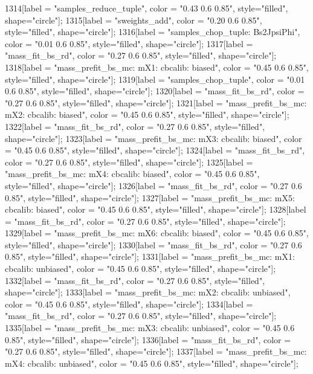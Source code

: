 {	1314[label = "samples_reduce_tuple", color = "0.43 0.6 0.85", style="filled", shape="circle"];
	1315[label = "sweights_add", color = "0.20 0.6 0.85", style="filled", shape="circle"];
	1316[label = "samples_chop_tuple\nmode: Bs2JpsiPhi", color = "0.01 0.6 0.85", style="filled", shape="circle"];
	1317[label = "mass_fit_bs_rd", color = "0.27 0.6 0.85", style="filled", shape="circle"];
	1318[label = "mass_prefit_bs_mc\nmassbin: mX1\nmassmodel: cbcalib\ntrigger: biased", color = "0.45 0.6 0.85", style="filled", shape="circle"];
	1319[label = "samples_chop_tuple", color = "0.01 0.6 0.85", style="filled", shape="circle"];
	1320[label = "mass_fit_bs_rd", color = "0.27 0.6 0.85", style="filled", shape="circle"];
	1321[label = "mass_prefit_bs_mc\nmassbin: mX2\nmassmodel: cbcalib\ntrigger: biased", color = "0.45 0.6 0.85", style="filled", shape="circle"];
	1322[label = "mass_fit_bs_rd", color = "0.27 0.6 0.85", style="filled", shape="circle"];
	1323[label = "mass_prefit_bs_mc\nmassbin: mX3\nmassmodel: cbcalib\ntrigger: biased", color = "0.45 0.6 0.85", style="filled", shape="circle"];
	1324[label = "mass_fit_bs_rd", color = "0.27 0.6 0.85", style="filled", shape="circle"];
	1325[label = "mass_prefit_bs_mc\nmassbin: mX4\nmassmodel: cbcalib\ntrigger: biased", color = "0.45 0.6 0.85", style="filled", shape="circle"];
	1326[label = "mass_fit_bs_rd", color = "0.27 0.6 0.85", style="filled", shape="circle"];
	1327[label = "mass_prefit_bs_mc\nmassbin: mX5\nmassmodel: cbcalib\ntrigger: biased", color = "0.45 0.6 0.85", style="filled", shape="circle"];
	1328[label = "mass_fit_bs_rd", color = "0.27 0.6 0.85", style="filled", shape="circle"];
	1329[label = "mass_prefit_bs_mc\nmassbin: mX6\nmassmodel: cbcalib\ntrigger: biased", color = "0.45 0.6 0.85", style="filled", shape="circle"];
	1330[label = "mass_fit_bs_rd", color = "0.27 0.6 0.85", style="filled", shape="circle"];
	1331[label = "mass_prefit_bs_mc\nmassbin: mX1\nmassmodel: cbcalib\ntrigger: unbiased", color = "0.45 0.6 0.85", style="filled", shape="circle"];
	1332[label = "mass_fit_bs_rd", color = "0.27 0.6 0.85", style="filled", shape="circle"];
	1333[label = "mass_prefit_bs_mc\nmassbin: mX2\nmassmodel: cbcalib\ntrigger: unbiased", color = "0.45 0.6 0.85", style="filled", shape="circle"];
	1334[label = "mass_fit_bs_rd", color = "0.27 0.6 0.85", style="filled", shape="circle"];
	1335[label = "mass_prefit_bs_mc\nmassbin: mX3\nmassmodel: cbcalib\ntrigger: unbiased", color = "0.45 0.6 0.85", style="filled", shape="circle"];
	1336[label = "mass_fit_bs_rd", color = "0.27 0.6 0.85", style="filled", shape="circle"];
	1337[label = "mass_prefit_bs_mc\nmassbin: mX4\nmassmodel: cbcalib\ntrigger: unbiased", color = "0.45 0.6 0.85", style="filled", shape="circle"];
}
